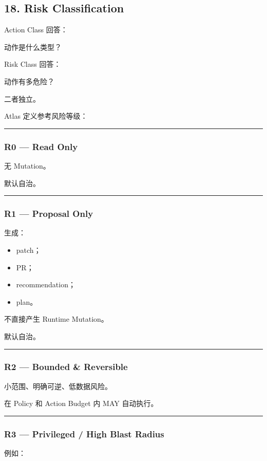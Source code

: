 \documentclass[11pt,a4paper]{article}
\begin{document}
\subsection{18. Risk Classification}
Action Class 回答：

\begin{gfmBlockquote}
动作是什么类型？
\end{gfmBlockquote}
Risk Class 回答：

\begin{gfmBlockquote}
动作有多危险？
\end{gfmBlockquote}
二者独立。

Atlas 定义参考风险等级：

\vspace{0.5em}\hrule\vspace{0.5em}
\subsubsection{R0 — Read Only}
无 Mutation。

默认自治。

\vspace{0.5em}\hrule\vspace{0.5em}
\subsubsection{R1 — Proposal Only}
生成：

\begin{itemize}
  \item patch；
  \item PR；
  \item recommendation；
  \item plan。
\end{itemize}
不直接产生 Runtime Mutation。

默认自治。

\vspace{0.5em}\hrule\vspace{0.5em}
\subsubsection{R2 — Bounded \& Reversible}
小范围、明确可逆、低数据风险。

在 Policy 和 Action Budget 内 MAY 自动执行。

\vspace{0.5em}\hrule\vspace{0.5em}
\subsubsection{R3 — Privileged / High Blast Radius}
例如：
\end{document}
